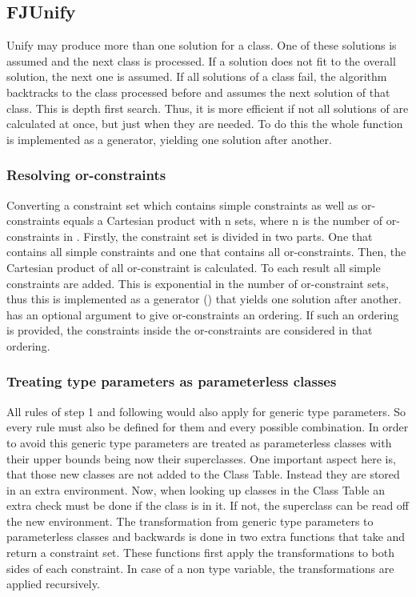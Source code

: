 \subsection{FJUnify}

Unify may produce more than one solution for a class. One of these solutions is assumed and the next class is processed. If a solution does not fit to the overall solution, the next one is assumed.
If all solutions of a class fail, the algorithm backtracks to the class processed before and assumes the next solution of that class. This is depth first search. Thus, it is more efficient if not all solutions of  are calculated at once, but just when they are needed.
To do this the whole function  is implemented as a generator, yielding one solution after another.

\subsubsection{Resolving or-constraints}
Converting a constraint set  which contains simple constraints as well as or-constraints equals a Cartesian product with n sets, where n is the number of or-constraints in .
Firstly, the constraint set  is divided in two parts. One that contains all simple constraints and one that contains all or-constraints.
Then, the Cartesian product of all or-constraint is calculated. To each result all simple constraints are added. This is exponential in the number of or-constraint sets, thus this is implemented as a generator () that yields one solution after another.
 has an optional argument to give or-constraints an ordering. If such an ordering is provided, the constraints inside the or-constraints are considered in that ordering.

\subsubsection{Treating type parameters as parameterless classes}
All rules of step 1 and following would also apply for generic type parameters. So every rule must also be defined for them and every possible combination. In order to avoid this generic type parameters are treated as parameterless classes with their upper bounds being now their superclasses. One important aspect here is, that those new classes are not added to the Class Table. Instead they are stored in an extra environment. Now, when looking up classes in the Class Table an extra check must be done if the class is in it. If not, the superclass can be read off the new environment.
The transformation from  generic type parameters to parameterless classes and backwards is done in two extra functions that take and return a constraint set.
These functions first apply the transformations to both sides of each constraint. In case of a non type variable, the transformations are applied recursively.

